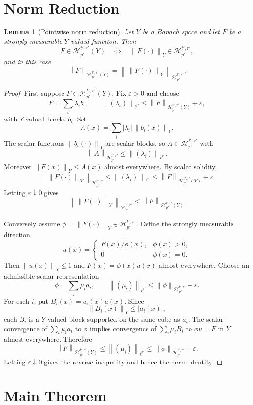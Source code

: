 \documentclass[11pt]{article}
\newtheorem{lemma}[theorem]{Lemma}
\newcommand{\Hsp}{\mathcal{H}_{p'}^{t',r'}}
\newcommand{\norm}[1]{\left\|#1\right\|}
\begin{document}
\section*{Norm Reduction}

\begin{lemma}[Pointwise norm reduction]
Let \(Y\) be a Banach space and let \(F\) be a strongly measurable
\(Y\)-valued function. Then
\[
F\in\Hsp(Y)
\quad\Longleftrightarrow\quad
\norm{F(\cdot)}_Y\in\Hsp,
\]
and in this case
\[
\norm{F}_{\Hsp(Y)}=\norm{\,\norm{F(\cdot)}_Y\,}_{\Hsp}.
\]
\end{lemma}

\begin{proof}
First suppose \(F\in\Hsp(Y)\). Fix \(\varepsilon>0\) and choose
\[
F=\sum_i \lambda_i b_i,\qquad
\norm{(\lambda_i)}_{\ell^{r'}}\leq \norm{F}_{\Hsp(Y)}+\varepsilon,
\]
with \(Y\)-valued blocks \(b_i\). Set
\[
A(x)=\sum_i |\lambda_i|\,\norm{b_i(x)}_Y .
\]
The scalar functions \(\norm{b_i(\cdot)}_Y\) are scalar blocks, so \(A\in\Hsp\)
with
\[
\norm{A}_{\Hsp}\leq \norm{(\lambda_i)}_{\ell^{r'}}.
\]
Moreover \(\norm{F(x)}_Y\leq A(x)\) almost everywhere. By scalar solidity,
\[
\norm{\,\norm{F(\cdot)}_Y\,}_{\Hsp}
\leq \norm{(\lambda_i)}_{\ell^{r'}}
\leq \norm{F}_{\Hsp(Y)}+\varepsilon .
\]
Letting \(\varepsilon\downarrow0\) gives
\[
\norm{\,\norm{F(\cdot)}_Y\,}_{\Hsp}\leq \norm{F}_{\Hsp(Y)}.
\]

Conversely assume \(\phi=\norm{F(\cdot)}_Y\in\Hsp\). Define the strongly
measurable direction
\[
u(x)=
\begin{cases}
F(x)/\phi(x), & \phi(x)>0,\\
0, & \phi(x)=0 .
\end{cases}
\]
Then \(\norm{u(x)}_Y\leq1\) and \(F(x)=\phi(x)u(x)\) almost everywhere. Choose
an admissible scalar representation
\[
\phi=\sum_i \mu_i a_i,\qquad
\norm{(\mu_i)}_{\ell^{r'}}\leq \norm{\phi}_{\Hsp}+\varepsilon.
\]
For each \(i\), put \(B_i(x)=a_i(x)u(x)\). Since
\[
\norm{B_i(x)}_Y\leq |a_i(x)|,
\]
each \(B_i\) is a \(Y\)-valued block supported on the same cube as \(a_i\).
The scalar convergence of \(\sum_i\mu_i a_i\) to \(\phi\) implies convergence
of \(\sum_i\mu_i B_i\) to \(\phi u=F\) in \(Y\) almost everywhere. Therefore
\[
\norm{F}_{\Hsp(Y)}\leq \norm{(\mu_i)}_{\ell^{r'}}
\leq \norm{\phi}_{\Hsp}+\varepsilon .
\]
Letting \(\varepsilon\downarrow0\) gives the reverse inequality and hence the
norm identity.
\end{proof}

\section*{Main Theorem}
\end{document}
